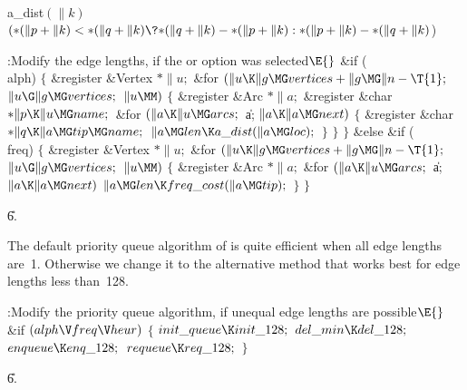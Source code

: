 \Y\B\4\D\\{a\_dist}$(\|k)$\5
$({*}(\|p+\|k)<{*}(\|q+\|k)\?{*}(\|q+\|k)-{*}(\|p+\|k):{*}(\|p+\|k)-{*}(\|q+%
\|k){}$)\par
\Y\B\4:Modify the edge lengths, if the  or  option
was selected\X${}\E{}$\6
\&{if} (\\{alph})\5
${}\{{}$\5
\1\&{register} \&{Vertex} ${}{*}\|u;{}$\7
\&{for} ${}(\|u\K\|g\MG\\{vertices}+\|g\MG\|n-\T{1};{}$ ${}\|u\G\|g\MG%
\\{vertices};{}$ ${}\|u\MM){}$\5
${}\{{}$\5
\1\&{register} \&{Arc} ${}{*}\|a;{}$\6
\&{register} \&{char} ${}{*}\|p\K\|u\MG\\{name};{}$\7
\&{for} ${}(\|a\K\|u\MG\\{arcs};{}$ \|a; ${}\|a\K\|a\MG\\{next}){}$\5
${}\{{}$\5
\1\&{register} \&{char} ${}{*}\|q\K\|a\MG\\{tip}\MG\\{name};{}$\7
${}\|a\MG\\{len}\K\\{a\_dist}(\|a\MG\\{loc});{}$\6
\4${}\}{}$\2\6
\4${}\}{}$\2\6
\4${}\}{}$\5
\2\&{else} \&{if} (\\{freq})\5
${}\{{}$\5
\1\&{register} \&{Vertex} ${}{*}\|u;{}$\7
\&{for} ${}(\|u\K\|g\MG\\{vertices}+\|g\MG\|n-\T{1};{}$ ${}\|u\G\|g\MG%
\\{vertices};{}$ ${}\|u\MM){}$\5
${}\{{}$\5
\1\&{register} \&{Arc} ${}{*}\|a;{}$\7
\&{for} ${}(\|a\K\|u\MG\\{arcs};{}$ \|a; ${}\|a\K\|a\MG\\{next}){}$\1\5
${}\|a\MG\\{len}\K\\{freq\_cost}(\|a\MG\\{tip});{}$\2\6
\4${}\}{}$\2\6
\4${}\}{}$\2\par
\U6.\fi

The default priority queue algorithm of  is quite
efficient
when all edge lengths are~1. Otherwise we change it to the
alternative method that works best for edge lengths less than~128.

\Y\B\4:Modify the priority queue algorithm, if unequal edge lengths are
possible\X${}\E{}$\6
\&{if} ${}(\\{alph}\V\\{freq}\V\\{heur}){}$\5
${}\{{}$\1\6
${}\\{init\_queue}\K\\{init\_128};{}$\6
${}\\{del\_min}\K\\{del\_128};{}$\6
${}\\{enqueue}\K\\{enq\_128};{}$\6
${}\\{requeue}\K\\{req\_128};{}$\6
\4${}\}{}$\2\par
\U6.\fi

